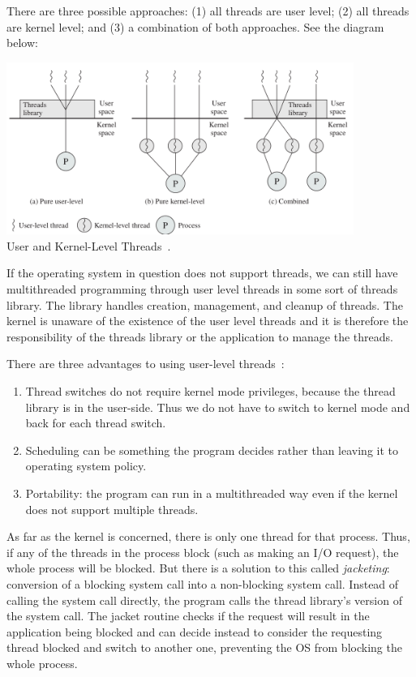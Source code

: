 There are three possible approaches: (1) all threads are user level; (2) all threads are kernel level; and (3) a combination of both approaches. See the diagram below:

\begin{center}
	\includegraphics[width=0.85\textwidth]{images/thread-types.png}\\
	User and Kernel-Level Threads~\cite{osi}.
\end{center}


If the operating system in question does not support threads, we can still have multithreaded programming through user level threads in some sort of threads library. The library handles creation, management, and cleanup of threads. The kernel is unaware of the existence of the user level threads and it is therefore the responsibility of the threads library or the application to manage the threads. 

There are three advantages to using user-level threads~\cite{osi}:
\begin{enumerate}
	\item Thread switches do not require kernel mode privileges, because the thread library is in the user-side. Thus we do not have to switch to kernel mode and back for each thread switch.
	\item Scheduling can be something the program decides rather than leaving it to operating system policy. 
	\item Portability: the program can run in a multithreaded way even if the kernel does not support multiple threads.
\end{enumerate}

As far as the kernel is concerned, there is only one thread for that process. Thus, if any of the threads in the process block (such as making an I/O request), the whole process will be blocked. But there is a solution to this called \textit{jacketing}: conversion of a blocking system call into a non-blocking system call. Instead of calling the system call directly, the program calls the thread library's version of the system call. The jacket routine checks if the request will result in the application being blocked and can decide instead to consider the requesting thread blocked and switch to another one, preventing the OS from blocking the whole process.

